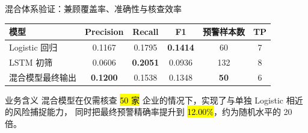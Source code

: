 \begin{frame}{混合体系验证：兼顾覆盖率、准确性与核查效率}
  \begin{table}
    \centering
    \small
    \begin{tabular}{@{}lccccc@{}}
      \toprule
      模型 & Precision & Recall & F1 & 预警样本数 & TP \\
      \midrule
      Logistic 回归 & 0.1167 & 0.1795 & \textbf{0.1414} & 60 & 7 \\
      LSTM 初筛 & 0.0606 & \textbf{0.2051} & 0.0936 & 132 & 8 \\
      混合模型最终输出 & \textbf{0.1200} & 0.1538 & 0.1348 & \textbf{50} & 6 \\
      \bottomrule
    \end{tabular}
  \end{table}

  \begin{alertblock}{业务含义}
    混合模型在仅需核查 \hl{50 家} 企业的情况下，实现了与单独 Logistic 相近的风险捕捉能力，
    同时把最终预警精确率提升到 \hl{12.00\%}，约为随机水平的 20 倍。
  \end{alertblock}
\end{frame}
